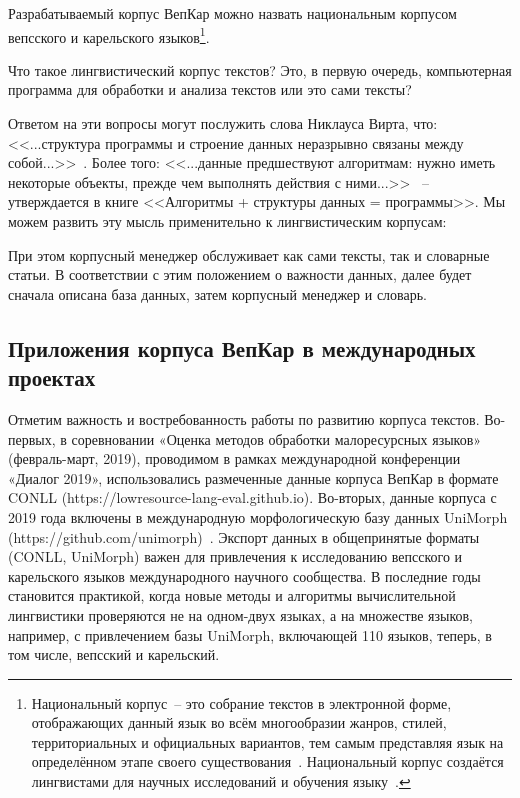 Разрабатываемый корпус ВепКар можно назвать национальным корпусом 
вепсского и карельского языков\footnote{ Национальный корпус~-- это собрание текстов 
в электронной форме, 
отображающих данный язык во всём многообразии жанров, стилей, территориальных и официальных вариантов, 
тем самым представляя язык на определённом этапе своего существования~\cite[с.~418]{Kibrik2019}. 
Национальный корпус создаётся лингвистами для научных исследований и обучения языку~\cite[с.~419]{Kibrik2019}.
}.

Что такое лингвистический корпус текстов? Это, в первую очередь, компьютерная программа для обработки и анализа текстов или это сами тексты? 

Ответом на эти вопросы могут послужить слова Никлауса Вирта, что: 
<<...структура программы и строение данных неразрывно связаны между собой...>>~\cite[с.~9]{Wirth1989AlgorithmsAndDataStructure}. 
Более того:   
<<...данные предшествуют алгоритмам: нужно иметь некоторые объекты, 
прежде чем выполнять действия с ними...>>~\cite[с.~8]{Wirth1985Algorithms+} 
-- утверждается в книге <<Алгоритмы + структуры данных = программы>>.
Мы можем развить эту мысль применительно к лингвистическим корпусам:
        

\noindent
При этом корпусный менеджер обслуживает как сами тексты, так и словарные статьи. 
В соответствии с этим положением о важности данных, далее будет  
сначала описана база данных, затем корпусный менеджер и словарь.

\subsection{Приложения корпуса ВепКар в международных проектах} \label{sect_VepKar_international}


Отметим важность и востребованность работы по развитию корпуса текстов. 
Во-первых, в соревновании «Оценка методов обработки малоресурсных языков» (февраль-март, 2019), проводимом в рамках международной конференции «Диалог 2019», использовались размеченные данные корпуса ВепКар в формате CONLL (https://lowresource-lang-eval.github.io). 
Во-вторых, данные корпуса с 2019 года включены в международную морфологическую базу данных UniMorph (https://github.com/unimorph)~\cite{McCarthy2020Unimorph}. Экспорт данных в общепринятые форматы (CONLL, UniMorph) важен для привлечения к исследованию вепсского и карельского языков международного научного сообщества. В последние годы становится практикой, когда новые методы и алгоритмы вычислительной лингвистики проверяются не на одном-двух языках, а на множестве языков, например, с привлечением базы UniMorph, включающей 110 языков, теперь, в том числе, вепсский и карельский. 

